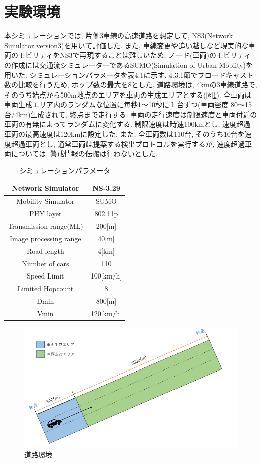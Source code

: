 \documentclass[10pt]{jreport}
\begin{document}
\section{実験環境}
本シミュレーションでは, 片側3車線の高速道路を想定して, NS3(Network Simulator version3)\cite{sample12}を用いて評価した. また, 車線変更や追い越しなど現実的な車両のモビリティをNS3で再現することは難しいため, ノード(車両)のモビリティの作成には交通流シミュレーターであるSUMO(Simulation of Urban Mobiity)\cite{sample13}を用いた. シミュレーションパラメータを表4.1に示す. 4.3.1節でブロードキャスト数の比較を行うため, ホップ数の最大を8とした. 道路環境は, 4kmの3車線道路で, そのうち始点から500m地点のエリアを車両の生成エリアとする(図\ref{fig:roadmap}). 全車両は車両生成エリア内のランダムな位置に毎秒1〜10秒に１台ずつ(車両密度 80〜15台/4km)生成されて, 終点まで走行する. 車両の走行速度は制限速度と車両付近の車両の有無によってランダムに変化する. 制限速度は時速100kmとし, 速度超過車両の最高速度は120kmに設定した. また, 全車両数は110台, そのうち10台を速度超過車両とし, 通常車両は提案する検出プロトコルを実行するが, 速度超過車両については, 警戒情報の伝搬は行わないとした.  

\begin{table}[H]
\caption{シミュレーションパラメータ}
\centering
\begin{tabular}{|c|c|}
\hline
Network Simulator      & NS-3.29    \\ \hline
Mobility Simulator     & SUMO       \\ \hline
PHY layer              & 802.11p    \\ \hline
Transmission range(ML) & 200{[}m{]} \\ \hline
Image processing range & 40{[}m{]} \\ \hline
Road length            & 4{[}km{]}  \\ \hline
Number of cars         & 110        \\ \hline
Speed Limit       & 100{[}km/h{]}          \\ \hline
Limited Hopcount   & 8  \\ \hline
Dmin       & 800{[}m{]}          \\ \hline
Vmin       & 120{[}km/h{]}          \\ \hline
\end{tabular}
\end{table}


\begin{figure}[H]
\centering
\includegraphics[width=12cm]{figures/4_1.png}
\caption{道路環境}
\label{fig:roadmap}
\end{figure}
\end{document}
